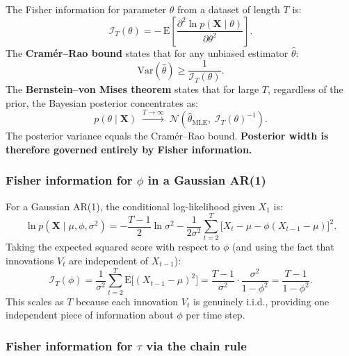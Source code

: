 \documentclass[11pt, a4paper]{article}
\begin{document}
The Fisher information for parameter $\theta$ from a dataset of length $T$ is:
\begin{equation}
    \mathcal{I}_T(\theta)
    = -\,\mathrm{E}\!\left[\frac{\partial^2 \ln p(\mathbf{X}\mid\theta)}{\partial\theta^2}\right].
\end{equation}
The \textbf{Cram\'er--Rao bound} states that for any unbiased estimator $\hat\theta$:
\begin{equation}
    \mathrm{Var}(\hat\theta) \geq \frac{1}{\mathcal{I}_T(\theta)}.
\end{equation}
The \textbf{Bernstein--von Mises theorem} states that for large $T$,
regardless of the prior, the Bayesian posterior concentrates as:
\begin{equation}
    p(\theta \mid \mathbf{X}) \;\xrightarrow{T\to\infty}\;
    \mathcal{N}\!\left(\hat\theta_\mathrm{MLE},\;\mathcal{I}_T(\theta)^{-1}\right).
\end{equation}
The posterior variance equals the Cram\'er--Rao bound.
\textbf{Posterior width is therefore governed entirely by Fisher information.}

\subsubsection*{Fisher information for $\phi$ in a Gaussian AR(1)}

For a Gaussian AR(1), the conditional log-likelihood given $X_1$ is:
\begin{equation}
    \ln p(\mathbf{X}\mid\mu,\phi,\sigma^2)
    = -\frac{T-1}{2}\ln\sigma^2
    - \frac{1}{2\sigma^2}\sum_{t=2}^{T}\bigl[X_t - \mu - \phi(X_{t-1}-\mu)\bigr]^2.
\end{equation}
Taking the expected squared score with respect to $\phi$
(and using the fact that innovations $V_t$ are independent of $X_{t-1}$):
\begin{equation}
    \mathcal{I}_T(\phi)
    = \frac{1}{\sigma^2}\sum_{t=2}^{T}\mathrm{E}\bigl[(X_{t-1}-\mu)^2\bigr]
    = \frac{T-1}{\sigma^2}\cdot\frac{\sigma^2}{1-\phi^2}
    = \frac{T-1}{1-\phi^2}.
    \label{eq:fisher_phi}
\end{equation}
This scales as $T$ because each innovation $V_t$ is genuinely i.i.d.,
providing one independent piece of information about $\phi$ per time step.

\subsubsection*{Fisher information for $\tau$ via the chain rule}
\end{document}
